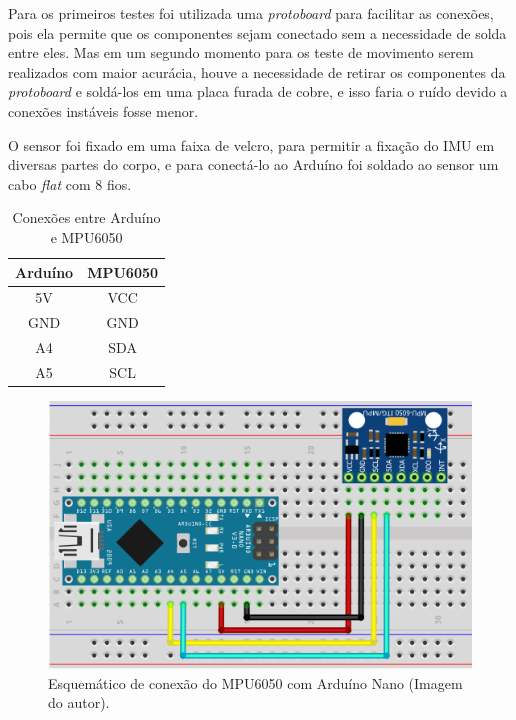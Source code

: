 		Para os primeiros testes foi utilizada uma \textit{protoboard} para facilitar as conexões, pois ela permite que os componentes sejam conectado sem a necessidade de solda entre eles. Mas em um segundo momento para os teste de movimento serem realizados com maior acurácia, houve a necessidade de retirar os componentes da \textit{protoboard} e soldá-los em uma placa furada de cobre, e isso faria o ruído devido a conexões instáveis fosse menor.
		
		O sensor foi fixado em uma faixa de velcro, para permitir a fixação do IMU em diversas partes do corpo, e para conectá-lo ao Arduíno foi soldado ao sensor um cabo \textit{flat} com 8 fios.
		
		\begin{table}[h!] \footnotesize
			\centering
			\caption{Conexões entre Arduíno e MPU6050}
			\label{conexoes_arduino}
			
			\begin{tabular}{cc}
				\toprule
				\textbf{Arduíno} & \textbf{MPU6050} \\
				\midrule
				5V & VCC \\
				GND & GND \\
				A4 & SDA \\
				A5 & SCL \\
				\bottomrule
			
			\end{tabular}
		\end{table}
		
		\begin{figure}[h!]
			\centering
			\includegraphics[keepaspectratio=true,scale=0.5]{figuras/conexoes_mpu_arduino.PNG}
			\caption{ Esquemático de conexão do MPU6050 com Arduíno Nano (Imagem do autor).}
		 \footnotesize
			\label{conexoes}	
		\end{figure}
		
